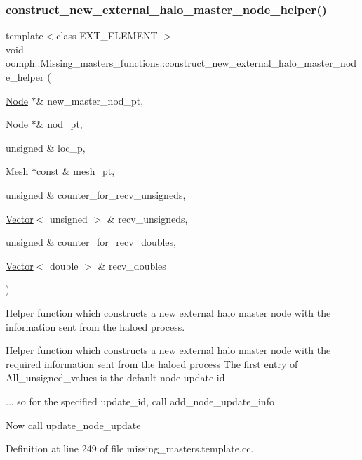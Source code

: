 \subsubsection{\texorpdfstring{construct\+\_\+new\+\_\+external\+\_\+halo\+\_\+master\+\_\+node\+\_\+helper()}{construct\_new\_external\_halo\_master\_node\_helper()}}
{\footnotesize\ttfamily template$<$class E\+X\+T\+\_\+\+E\+L\+E\+M\+E\+NT $>$ \\
void oomph\+::\+Missing\+\_\+masters\+\_\+functions\+::construct\+\_\+new\+\_\+external\+\_\+halo\+\_\+master\+\_\+node\+\_\+helper (\begin{DoxyParamCaption}\item[{\hyperlink{classoomph_1_1Node}{Node} $\ast$\&}]{new\+\_\+master\+\_\+nod\+\_\+pt,  }\item[{\hyperlink{classoomph_1_1Node}{Node} $\ast$\&}]{nod\+\_\+pt,  }\item[{unsigned \&}]{loc\+\_\+p,  }\item[{\hyperlink{classoomph_1_1Mesh}{Mesh} $\ast$const \&}]{mesh\+\_\+pt,  }\item[{unsigned \&}]{counter\+\_\+for\+\_\+recv\+\_\+unsigneds,  }\item[{\hyperlink{classoomph_1_1Vector}{Vector}$<$ unsigned $>$ \&}]{recv\+\_\+unsigneds,  }\item[{unsigned \&}]{counter\+\_\+for\+\_\+recv\+\_\+doubles,  }\item[{\hyperlink{classoomph_1_1Vector}{Vector}$<$ double $>$ \&}]{recv\+\_\+doubles }\end{DoxyParamCaption})}



Helper function which constructs a new external halo master node with the information sent from the haloed process. 

Helper function which constructs a new external halo master node with the required information sent from the haloed process The first entry of All\+\_\+unsigned\+\_\+values is the default node update id

... so for the specified update\+\_\+id, call add\+\_\+node\+\_\+update\+\_\+info

Now call update\+\_\+node\+\_\+update 

Definition at line 249 of file missing\+\_\+masters.\+template.\+cc.



